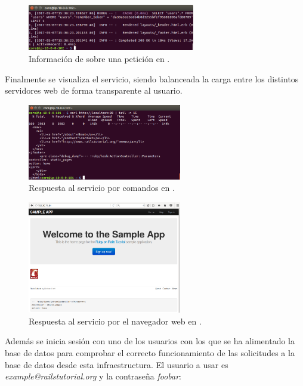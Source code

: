 \begin{figure}[H]
\centering
\includegraphics[width=0.65\textwidth]{images/figures/logs2-confd.png}
\caption{Información de  sobre una petición en .}
\end{figure}

Finalmente se visualiza el servicio, siendo balanceada la carga entre los distintos servidores web de forma transparente al usuario.

\begin{figure}[H]
\centering
\includegraphics[width=0.6\textwidth]{images/figures/curl-confd.png}
\caption{Respuesta al servicio por comandos en .}
\end{figure}

\begin{figure}[H]
\centering
\includegraphics[width=0.6\textwidth]{images/figures/web-confd.png}
\caption{Respuesta al servicio por el navegador web en .}
\end{figure}

Además se inicia sesión con uno de los usuarios con los que se ha alimentado la base de datos para comprobar el correcto funcionamiento de las solicitudes a la base de datos desde esta infraestructura. El usuario a usar es \textit{example@railstutorial.org} y la contraseña \textit{foobar}:

